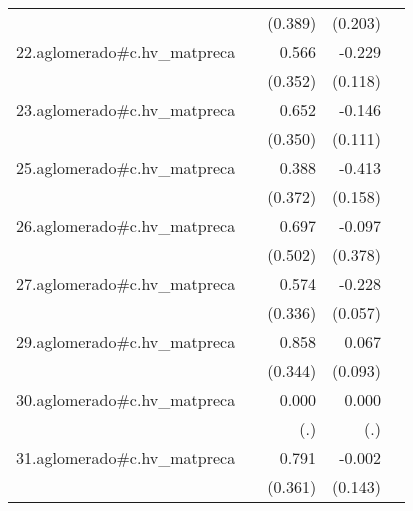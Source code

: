 {\begin{longtable}{l*{4}{D{.}{.}{-1}}}
            &                     &     (0.389)         &     (0.203)         &                     \\
\addlinespace
22.aglomerado#c.hv\_matpreca&                     &       0.566         &      -0.229         &                     \\
            &                     &     (0.352)         &     (0.118)         &                     \\
\addlinespace
23.aglomerado#c.hv\_matpreca&                     &       0.652         &      -0.146         &                     \\
            &                     &     (0.350)         &     (0.111)         &                     \\
\addlinespace
25.aglomerado#c.hv\_matpreca&                     &       0.388         &      -0.413\sym{**} &                     \\
            &                     &     (0.372)         &     (0.158)         &                     \\
\addlinespace
26.aglomerado#c.hv\_matpreca&                     &       0.697         &      -0.097         &                     \\
            &                     &     (0.502)         &     (0.378)         &                     \\
\addlinespace
27.aglomerado#c.hv\_matpreca&                     &       0.574         &      -0.228\sym{***}&                     \\
            &                     &     (0.336)         &     (0.057)         &                     \\
\addlinespace
29.aglomerado#c.hv\_matpreca&                     &       0.858\sym{*}  &       0.067         &                     \\
            &                     &     (0.344)         &     (0.093)         &                     \\
\addlinespace
30.aglomerado#c.hv\_matpreca&                     &       0.000         &       0.000         &                     \\
            &                     &         (.)         &         (.)         &                     \\
\addlinespace
31.aglomerado#c.hv\_matpreca&                     &       0.791\sym{*}  &      -0.002         &                     \\
            &                     &     (0.361)         &     (0.143)         &                     \\

\end{longtable}}
